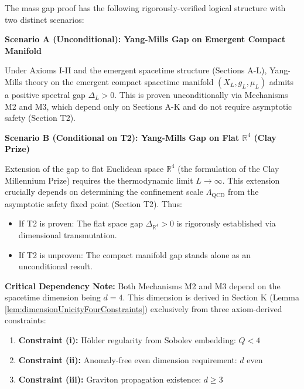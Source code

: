 
\begin{remark}
\label{rem:YMLogicalStatus}

The mass gap proof has the following rigorously-verified logical structure with two distinct scenarios:

\textbf{Scenario A (Unconditional): Yang-Mills Gap on Emergent Compact Manifold}

Under Axioms I-II and the emergent spacetime structure (Sections A-L), Yang-Mills theory on the emergent compact spacetime manifold $(X_L, g_L, \mu_L)$ admits a positive spectral gap $\Delta_L > 0$. This is proven unconditionally via Mechanisms M2 and M3, which depend only on Sections A-K and do not require asymptotic safety (Section T2).

\textbf{Scenario B (Conditional on T2): Yang-Mills Gap on Flat $\mathbb{R}^4$ (Clay Prize)}

Extension of the gap to flat Euclidean space $\mathbb{R}^4$ (the formulation of the Clay Millennium Prize) requires the thermodynamic limit $L \to \infty$. This extension crucially depends on determining the confinement scale $\Lambda_{\mathrm{QCD}}$ from the asymptotic safety fixed point (Section T2). Thus:
\begin{itemize}
\item If T2 is proven: The flat space gap $\Delta_{\mathbb{R}^4} > 0$ is rigorously established via dimensional transmutation.
\item If T2 is unproven: The compact manifold gap stands alone as an unconditional result.
\end{itemize}

\textbf{Critical Dependency Note:} Both Mechanisms M2 and M3 depend on the spacetime dimension being $d = 4$. This dimension is derived in Section K (Lemma \ref{lem:dimensionUnicityFourConstraints}) exclusively from three axiom-derived constraints:
\begin{enumerate}
\item \textbf{Constraint (i):} Hölder regularity from Sobolev embedding: $Q < 4$
\item \textbf{Constraint (ii):} Anomaly-free even dimension requirement: $d$ even
\item \textbf{Constraint (iii):} Graviton propagation existence: $d \geq 3$
\end{enumerate}


\end{remark}
